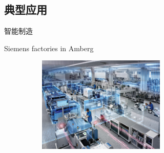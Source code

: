 \subsection{典型应用}
\begin{frame}{智能制造}
	\begin{exampleblock}{\textrm{Siemens factories in Amberg}}

\begin{figure}[h!]
\centering
     \includegraphics[height=1.8in, width=3.1in, viewport=0 0 2650 1992,clip]{Figures/Siemens_Amberg-Factory.jpeg}
\label{Fig:Siemens_Amberg-Factory}
\end{figure}
  \end{exampleblock}
\fontsize{8.2pt}{6.2pt}
\end{frame}

